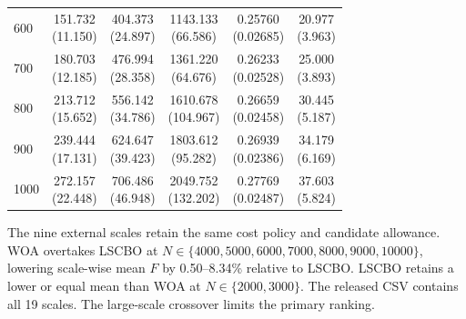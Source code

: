 \begin{table}[!htbp]
\begin{tabular}{l c c c c c}
600 & \shortstack{151.732\\(11.150)} & \shortstack{404.373\\(24.897)} & \shortstack{1143.133\\(66.586)} & \shortstack{0.25760\\(0.02685)} & \shortstack{20.977\\(3.963)} \\
700 & \shortstack{180.703\\(12.185)} & \shortstack{476.994\\(28.358)} & \shortstack{1361.220\\(64.676)} & \shortstack{0.26233\\(0.02528)} & \shortstack{25.000\\(3.893)} \\
800 & \shortstack{213.712\\(15.652)} & \shortstack{556.142\\(34.786)} & \shortstack{1610.678\\(104.967)} & \shortstack{0.26659\\(0.02458)} & \shortstack{30.445\\(5.187)} \\
900 & \shortstack{239.444\\(17.131)} & \shortstack{624.647\\(39.423)} & \shortstack{1803.612\\(95.282)} & \shortstack{0.26939\\(0.02386)} & \shortstack{34.179\\(6.169)} \\
1000 & \shortstack{272.157\\(22.448)} & \shortstack{706.486\\(46.948)} & \shortstack{2049.752\\(132.202)} & \shortstack{0.27769\\(0.02487)} & \shortstack{37.603\\(5.824)} \\
\bottomrule
\end{tabular}
\end{table}
\FloatBarrier
The nine external scales retain the same cost policy and candidate allowance. WOA overtakes LSCBO at $N\in\{4000, 5000, 6000, 7000, 8000, 9000, 10000\}$, lowering scale-wise mean $F$ by 0.50--8.34\% relative to LSCBO. LSCBO retains a lower or equal mean than WOA at $N\in\{2000, 3000\}$. The released CSV contains all 19 scales. The large-scale crossover limits the primary ranking.
